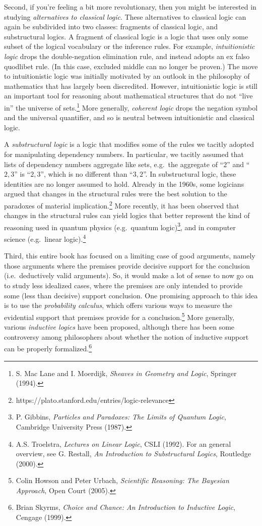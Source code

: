 Second, if you're feeling a bit more revolutionary, then you might be
interested in studying \emph{alternatives to classical logic}.  These
alternatives to classical logic can again be subdivided into two
classes: fragments of classical logic, and substructural logics.  A
fragment of classical logic is a logic that uses only some subset of
the logical vocabulary or the inference rules.  For example,
\emph{intuitionistic logic} drops the double-negation elimination
rule, and instead adopts an ex falso quodlibet rule.  (In this case,
excluded middle can no longer be proven.)  The move to intuitionistic
logic was initially motivated by an outlook in the philosophy of
mathematics that has largely been discredited.  However,
intuitionistic logic is still an important tool for reasoning about
mathematical structures that do not ``live in'' the universe of
sets.\footnote{S. Mac Lane and I. Moerdijk, {\it Sheaves in Geometry
    and Logic}, Springer (1994).}  More generally, \emph{coherent
  logic} drops the negation symbol and the universal quantifier, and
so is neutral between intuitionistic and classical logic.

A \emph{substructural logic} is a logic that modifies some of the
rules we tacitly adopted for manipulating dependency numbers.  In
particular, we tacitly assumed that lists of dependency numbers
aggregate like sets, e.g.\ the aggregate of ``$2$'' and ``$2,3$'' is
``$2,3$'', which is no different than ``$3,2$''.  In substructural
logic, these identities are no longer assumed to hold.  Already in the
1960s, some logicians argued that changes in the structural rules were
the best solution to the paradoxes of material
implication.\footnote{https://plato.stanford.edu/entries/logic-relevance}
More recently, it has been observed that changes in the structural
rules can yield logics that better represent the kind of reasoning
used in quantum physics (e.g.\ quantum logic)\footnote{P. Gibbins,
  {\it Particles and Paradoxes: The Limits of Quantum Logic},
  Cambridge University Press (1987).}, and in computer science (e.g.\
linear logic).\footnote{A.S. Troelstra, {\it Lectures on Linear
    Logic}, CSLI (1992). For an general overview, see G. Restall, {\it
    An Introduction to Substructural Logics}, Routledge
  (2000).} \label{relevant}

Third, this entire book has focused on a limiting case of good
arguments, namely those arguments where the premises provide decisive
support for the conclusion (i.e.\ deductively valid arguments).  So,
it would make a lot of sense to now go on to study less idealized
cases, where the premises are only intended to provide some (less than
decisive) support conclusion.  One promising approach to this idea is
to use the \emph{probability calculus}, which offers various ways to
measure the evidential support that premises provide for a
conclusion.\footnote{Colin Howson and Peter Urbach, {\it Scientific
    Reasoning: The Bayesian Approach}, Open Court (2005).}  More
generally, various \emph{inductive logics} have been proposed,
although there has been some controversy among philosophers about
whether the notion of inductive support can be properly
formalized.\footnote{Brian Skyrms, {\it Choice and Chance: An
    Introduction to Inductive Logic}, Cengage (1999).}

